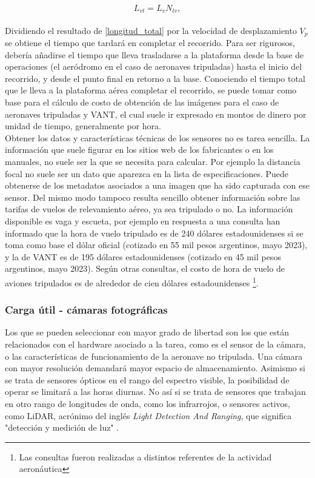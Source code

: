 \\
\begin{equation}
	L_{vt}={L_v}{N_{lv}},\label{longitud_total}
\end{equation}
\\
Dividiendo el resultado de \ref{longitud_total} por la velocidad de desplazamiento $V_p$ se obtiene el tiempo que tardará en completar el recorrido. Para ser rigurosos, debería añadirse el tiempo que lleva trasladarse a la plataforma desde la base de operaciones (el aeródromo en el caso de aeronaves tripuladas) hasta el inicio del recorrido, y desde el punto final en retorno a la base.
Conociendo el tiempo total que le lleva a la plataforma aérea completar el recorrido, se puede tomar como base para el cálculo de costo de obtención de las imágenes para el caso de aeronaves tripuladas y VANT, el cual suele ir expresado en montos de dinero por unidad de tiempo, generalmente por hora. \\
Obtener los datos y características técnicas de los sensores no es tarea sencilla. La información que suele figurar en los sitios web de los fabricantes o en los manuales, no suele ser la que se necesita para calcular. Por ejemplo la distancia focal no suele ser un dato que aparezca en la lista de especificaciones. Puede obtenerse de los metadatos asociados a una imagen que ha sido capturada con ese sensor.
Del mismo modo tampoco resulta sencillo obtener información sobre las tarifas de vuelos de relevamiento aéreo, ya sea tripulado o no. La información disponible es vaga y escueta, por ejemplo en respuesta a una consulta han informado que la hora de vuelo tripulado es de 240 dólares estadounidenses si se toma como base el dólar oficial (cotizado en 55 mil pesos argentinos, mayo 2023), y la de VANT es de 195 dólares estadounidenses (cotizado en 45 mil pesos argentinos, mayo 2023). Según otras consultas, el costo de hora de vuelo de aviones tripulados es de alrededor de cien dólares estadounidenses \footnote{Las consultas fueron realizadas a distintos referentes de la actividad aeronáutica}.
\subsubsection{Carga útil - cámaras fotográficas}
Los que se pueden seleccionar con mayor grado de libertad son los que están relacionados con el hardware asociado a la tarea, como es el sensor de la cámara, o las características de funcionamiento de la aeronave no tripulada. Una cámara con mayor resolución demandará mayor espacio de almacenamiento. Asimismo si se trata de sensores ópticos en el rango del espectro visible, la posibilidad de operar se limitará a las horas diurnas. No así si se trata de sensores que trabajan en otro rango de longitudes de onda, como los infrarrojos, o sensores activos, como LiDAR, acrónimo del inglés \textit{Light Detection And Ranging}, que significa "detección y medición de luz" \cite{ferraz_lidar_2016}.
